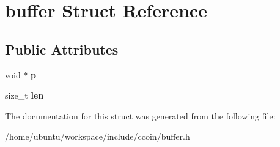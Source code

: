 \hypertarget{structbuffer}{\section{buffer Struct Reference}
\label{structbuffer}
}
\subsection*{Public Attributes}
\begin{DoxyCompactItemize}
\item 
\hypertarget{structbuffer_af67492063d0058eacdcff9996319f64b}{void $\ast$ {\bfseries p}}\label{structbuffer_af67492063d0058eacdcff9996319f64b}

\item 
\hypertarget{structbuffer_a2966e19c7a1355df268a743450746f8e}{size\-\_\-t {\bfseries len}}\label{structbuffer_a2966e19c7a1355df268a743450746f8e}

\end{DoxyCompactItemize}


The documentation for this struct was generated from the following file\-:\begin{DoxyCompactItemize}
\item 
/home/ubuntu/workspace/include/ccoin/buffer.\-h\end{DoxyCompactItemize}
